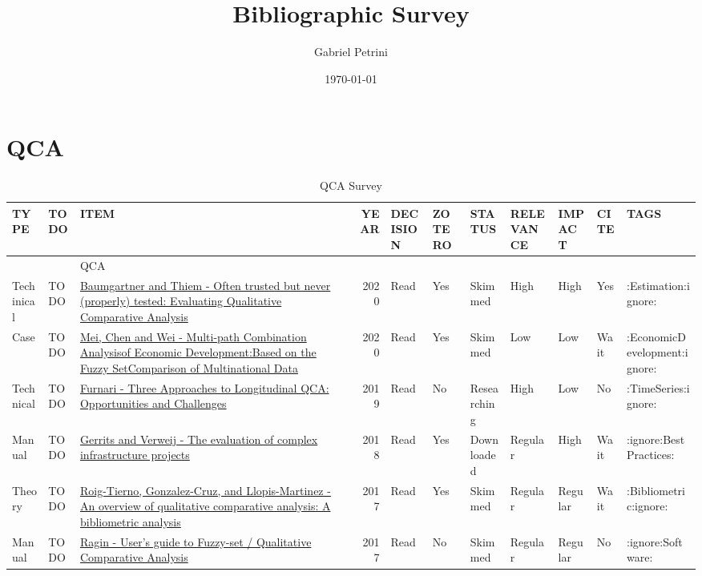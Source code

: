 \documentclass[11pt]{article}
\author{Gabriel Petrini}
\date{\today}
\title{Bibliographic Survey}
\begin{document}
\maketitle
\tableofcontents


\section*{QCA}
\label{sec:org558c964}
\begin{table}[htbp]
\caption{QCA Survey}
\centering
\begin{tabular}{lllrlllllll}
TYPE & TODO & ITEM & YEAR & DECISION & ZOTERO & STATUS & RELEVANCE & IMPACT & CITE & TAGS\\
\hline
 &  & QCA &  &  &  &  &  &  &  & \\
\hline
Techinical & TODO & \href{https://doi.org/10.1177/0049124117701487}{Baumgartner and Thiem - Often trusted but never (properly) tested: Evaluating Qualitative Comparative Analysis} & 2020 & Read & Yes & Skimmed & High & High & Yes & :Estimation:ignore:\\
\hline
Case & TODO & \href{https://doi.org/10.1007/978-3-030-49829-0}{Mei, Chen and Wei - Multi-path Combination Analysisof Economic Development:Based on the Fuzzy SetComparison of Multinational Data} & 2020 & Read & Yes & Skimmed & Low & Low & Wait & :EconomicDevelopment:ignore:\\
\hline
Technical & TODO & \href{http://faculty.marshall.usc.edu/Peer-Fiss/5\_Furnari\_2019\_Longitudinal\_QCA\_AOM\_PDW2019.pdf}{Furnari - Three Approaches to Longitudinal QCA: Opportunities and Challenges} & 2019 & Read & No & Researching & High & Low & No & :TimeSeries:ignore:\\
\hline
Manual & TODO & \href{https://stefanverweij.eu/wp-content/uploads/2018/09/2018-Edward-Elgar-Gerrits-Verweij.pdf}{Gerrits and Verweij - The evaluation of complex infrastructure projects} & 2018 & Read & Yes & Downloaded & Regular & High & Wait & :ignore:BestPractices:\\
\hline
Theory & TODO & \href{https://www.sciencedirect.com/science/article/pii/S2444569X16300257}{Roig-Tierno, Gonzalez-Cruz, and Llopis-Martinez -  An overview of qualitative comparative analysis: A bibliometric analysis} & 2017 & Read & Yes & Skimmed & Regular & Regular & Wait & :Bibliometric:ignore:\\
\hline
Manual & TODO & \href{http://www.socsci.uci.edu/\~cragin/fsQCA/software.shtml}{Ragin - User's guide to Fuzzy-set / Qualitative Comparative Analysis} & 2017 & Read & No & Skimmed & Regular & Regular & No & :ignore:Software:\\

\end{tabular}
\end{table}
\end{document}
